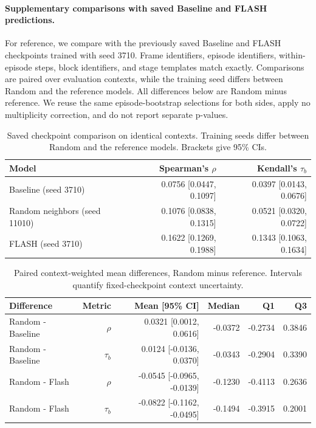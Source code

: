 \paragraph{Supplementary comparisons with saved Baseline and FLASH predictions.}
For reference, we compare with the previously saved Baseline and FLASH checkpoints trained with seed 3710. Frame identifiers, episode identifiers, within-episode steps, block identifiers, and stage templates match exactly. Comparisons are paired over evaluation contexts, while the training seed differs between Random and the reference models. All differences below are Random minus reference. We reuse the same episode-bootstrap selections for both sides, apply no multiplicity correction, and do not report separate p-values.

\begin{table}[!htbp]
\centering
\small
\caption{Saved checkpoint comparison on identical contexts. Training seeds differ between Random and the reference models. Brackets give 95\% CIs.}
\label{tab:random11010_comparison_means}
\begin{tabular}{lrr}
\toprule
Model & Spearman's $\rho$ & Kendall's $\tau_b$ \\
\midrule
Baseline (seed 3710) & 0.0756 [0.0447, 0.1097] & 0.0397 [0.0143, 0.0676] \\
Random neighbors (seed 11010) & 0.1076 [0.0838, 0.1315] & 0.0521 [0.0320, 0.0722] \\
FLASH (seed 3710) & 0.1622 [0.1269, 0.1988] & 0.1343 [0.1063, 0.1634] \\
\bottomrule
\end{tabular}
\end{table}

\begin{table}[!htbp]
\centering
\small
\caption{Paired context-weighted mean differences, Random minus reference. Intervals quantify fixed-checkpoint context uncertainty.}
\label{tab:random11010_differences}
\begin{tabular}{lrrrrr}
\toprule
Difference & Metric & Mean [95\% CI] & Median & Q1 & Q3 \\
\midrule
Random - Baseline & $\rho$ & 0.0321 [0.0012, 0.0616] & -0.0372 & -0.2734 & 0.3846 \\
Random - Baseline & $\tau_b$ & 0.0124 [-0.0136, 0.0370] & -0.0343 & -0.2904 & 0.3390 \\
Random - Flash & $\rho$ & -0.0545 [-0.0965, -0.0139] & -0.1230 & -0.4113 & 0.2636 \\
Random - Flash & $\tau_b$ & -0.0822 [-0.1162, -0.0495] & -0.1494 & -0.3915 & 0.2001 \\
\bottomrule
\end{tabular}
\end{table}

